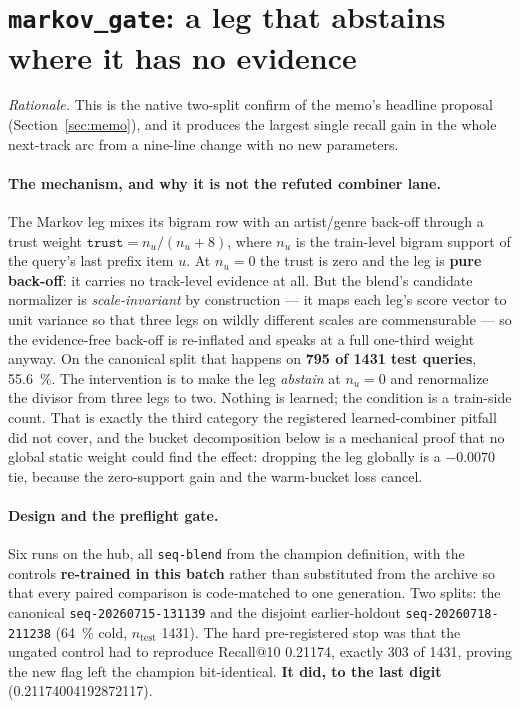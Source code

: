 \documentclass[11pt]{article}
\newcommand{\dsid}[1]{\texttt{\small #1}}
\begin{document}
\section{\texttt{markov\_gate}: a leg that abstains where it has no evidence}
\label{sec:markovgate}
\emph{Rationale.} This is the native two-split confirm of the memo's headline
proposal (Section~\ref{sec:memo}), and it produces the largest single recall gain
in the whole next-track arc from a nine-line change with no new parameters.

\paragraph{The mechanism, and why it is not the refuted combiner lane.} The Markov
leg mixes its bigram row with an artist/genre back-off through a trust weight
$\texttt{trust} = n_u/(n_u+8)$, where $n_u$ is the train-level bigram support of
the query's last prefix item $u$. At $n_u = 0$ the trust is zero and the leg is
\textbf{pure back-off}: it carries no track-level evidence at all. But the blend's
candidate normalizer is \emph{scale-invariant} by construction --- it maps each
leg's score vector to unit variance so that three legs on wildly different scales
are commensurable --- so the evidence-free back-off is re-inflated and speaks at a
full one-third weight anyway. On the canonical split that happens on \textbf{\num{795}
of \num{1431} test queries}, \SI{55.6}{\percent}. The intervention is to make the
leg \emph{abstain} at $n_u = 0$ and renormalize the divisor from three legs to two.
Nothing is learned; the condition is a train-side count. That is exactly the third
category the registered learned-combiner pitfall did not cover, and the bucket
decomposition below is a mechanical proof that no global static weight could find
the effect: dropping the leg globally is a $-\num{0.0070}$ tie, because the
zero-support gain and the warm-bucket loss cancel.

\paragraph{Design and the preflight gate.} Six runs on the hub, all
\texttt{seq-blend} from the champion definition, with the controls
\textbf{re-trained in this batch} rather than substituted from the archive so that
every paired comparison is code-matched to one generation. Two splits: the
canonical \dsid{seq-20260715-131139} and the disjoint earlier-holdout
\dsid{seq-20260718-211238} (\SI{64}{\percent} cold, $n_{\mathrm{test}}$
\num{1431}). The hard pre-registered stop was that the ungated control had to
reproduce Recall@10 \num{0.21174}, exactly \num{303} of \num{1431}, proving the new
flag left the champion bit-identical. \textbf{It did, to the last digit}
(\num{0.21174004192872117}).
\end{document}
